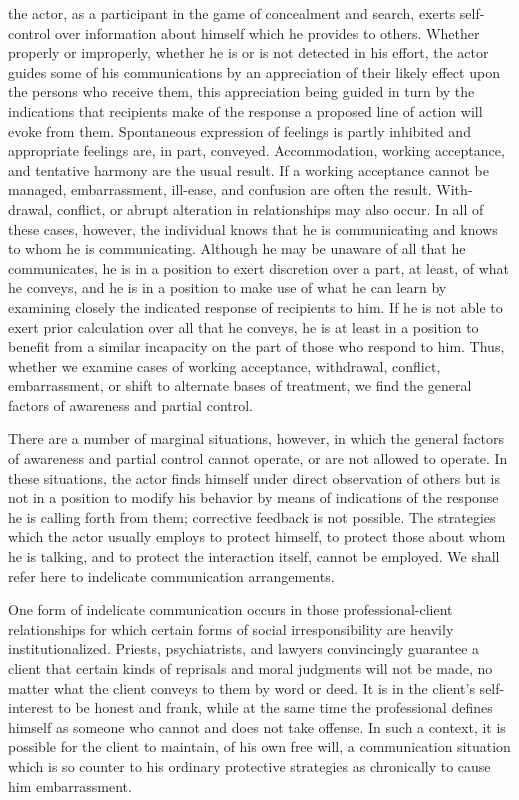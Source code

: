 \documentclass[openany,nobib]{tufte-book}
\begin{document}
the actor, as a participant in the game of
concealment and search, exerts self-control over in­formation about
himself which he provides to others. Whether properly or improperly,
whether he is or is not detected in his effort, the actor guides some of
his communications by an appre­ciation of their likely effect upon the
persons who receive them, this appreciation being guided in turn by the
indications that recipients make of the response a proposed line of
action will evoke from them. Spontaneous expression of feelings is
partly inhibited and appropriate feelings are, in part, conveyed.
Ac­commodation, working acceptance, and tentative harmony are the usual
result. If a working acceptance cannot be managed, embarrassment,
ill-ease, and confusion are often the result. With­drawal, conflict, or
abrupt alteration in relationships may also occur. In all of these
cases, however, the individual knows that he is communicating and knows
to whom he is communicating. Although he may be unaware of all that he
communicates, he is in a position to exert discretion over a part, at
least, of what he conveys, and he is in a position to make use of what
he can learn by examining closely the indicated response of recipients
to him. If he is not able to exert prior calculation over all that he
conveys, he is at least in a position to benefit from a similar
incapacity on the part of those who respond to him. Thus, whether we
examine cases of working acceptance, withdrawal, con­flict,
embarrassment, or shift to alternate bases of treatment, we find the
general factors of awareness and partial control.

There are a number of marginal situations, however, in which the general
factors of awareness and partial control can­not operate, or are not
allowed to operate. In these situations, the actor finds himself under
direct observation of others but is not in a position to modify his
behavior by means of indica­tions of the response he is calling forth
from them; corrective feedback is not possible. The strategies which the
actor usually employs to protect himself, to protect those about whom he
is talking, and to protect the interaction itself, cannot be employed.
We shall refer here to indelicate communication arrangements.

One form of indelicate communication occurs in those ­professional-client
relationships for which certain forms of social irresponsibility are
heavily institutionalized. Priests, psychiatrists, and lawyers
convincingly guarantee a client that certain kinds of reprisals and
moral judgments will not be made, no matter what the client conveys to
them by word or deed. It is in the client's self-interest to be honest
and frank, while at the same time the professional defines himself as
someone who cannot and does not take offense. In such a context, it is
pos­sible for the client to maintain, of his own free will, a
com­munication situation which is so counter to his ordinary protective
strategies as chronically to cause him embarrassment.
\end{document}
